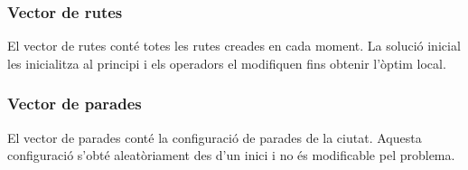 \subsubsection{Vector de rutes} %

El vector de rutes conté totes les rutes creades en cada moment. La solució inicial les inicialitza al principi i els operadors el modifiquen fins obtenir l'òptim local.

\subsubsection{Vector de parades} %

El vector de parades conté la configuració de parades de la ciutat. Aquesta configuració s'obté aleatòriament des d'un inici i no és modificable pel problema.

